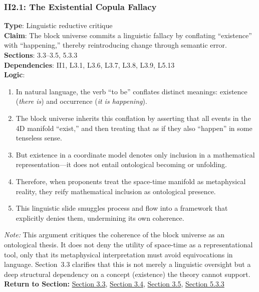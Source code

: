 \documentclass[12pt]{book}
\begin{document}
\subsubsection*{II2.1: The Existential Copula Fallacy}
\label{appendix:II2.1}
\textbf{Type}: Linguistic reductive critique\\
\textbf{Claim}: The block universe commits a linguistic fallacy by conflating ``existence'' with ``happening,'' thereby reintroducing change through semantic error.\\
\textbf{Sections}: 3.3–3.5, 5.3.3\\
\textbf{Dependencies}: II1, L3.1, L3.6, L3.7, L3.8, L3.9, L5.13\\
\textbf{Logic}:
\begin{enumerate}
    \item In natural language, the verb ``to be'' conflates distinct meanings: existence (\textit{there is}) and occurrence (\textit{it is happening}).
    \item The block universe inherits this conflation by asserting that all events in the 4D manifold ``exist,'' and then treating that as if they also ``happen'' in some tenseless sense.
    \item But existence in a coordinate model denotes only inclusion in a mathematical representation---it does not entail ontological becoming or unfolding.
    \item Therefore, when proponents treat the space-time manifold as metaphysical reality, they reify mathematical inclusion as ontological presence.
    \item This linguistic slide smuggles process and flow into a framework that explicitly denies them, undermining its own coherence.
\end{enumerate}
\textit{Note:} This argument critiques the coherence of the block universe as an ontological thesis. It does not deny the utility of space-time as a representational tool, only that its metaphysical interpretation must avoid equivocations in language. Section~3.3 clarifies that this is not merely a linguistic oversight but a deep structural dependency on a concept (existence) the theory cannot support.\\
\textbf{Return to Section:} \hyperref[sec:3.3]{Section 3.3}, \hyperref[sec:3.4]{Section 3.4}, \hyperref[sec:3.5]{Section 3.5}, \hyperref[sec:5.3.3]{Section 5.3.3}
\end{document}
